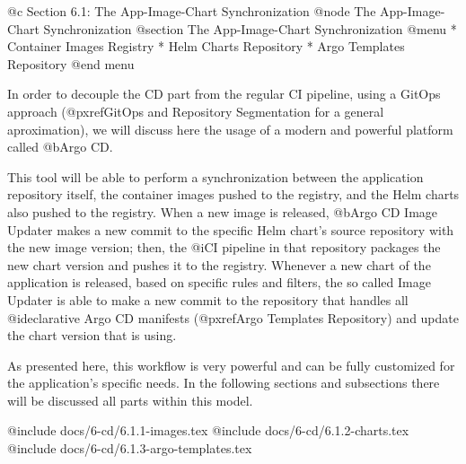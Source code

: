 @c Section 6.1: The App-Image-Chart Synchronization
@node The App-Image-Chart Synchronization
@section The App-Image-Chart Synchronization
@menu
* Container Images Registry
* Helm Charts Repository
* Argo Templates Repository
@end menu

In order to decouple the CD part from the regular CI pipeline, using a GitOps approach (@pxref{GitOps and Repository Segmentation} for a general aproximation), we will discuss here the usage of a modern and powerful platform called @b{Argo CD}.

This tool will be able to perform a synchronization between the application repository itself, the container images pushed to the registry, and the Helm charts also pushed to the registry. When a new image is released, @b{Argo CD Image Updater} makes a new commit to the specific Helm chart's source repository with the new image version; then, the @i{CI pipeline} in that repository packages the new chart version and pushes it to the registry. Whenever a new chart of the application is released, based on specific rules and filters, the so called Image Updater is able to make a new commit to the repository that handles all @i{declarative Argo CD manifests} (@pxref{Argo Templates Repository}) and update the chart version that is using.

As presented here, this workflow is very powerful and can be fully customized for the application's specific needs. In the following sections and subsections there will be discussed all parts within this model.

@include docs/6-cd/6.1.1-images.tex
@include docs/6-cd/6.1.2-charts.tex
@include docs/6-cd/6.1.3-argo-templates.tex
